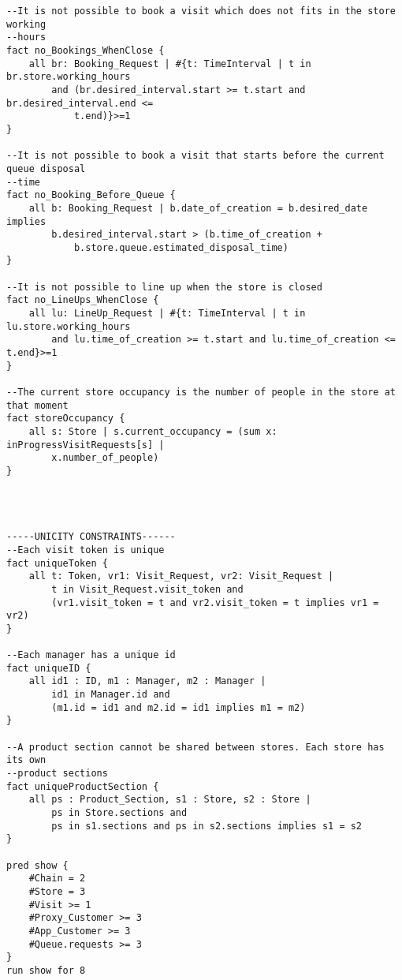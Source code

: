 \begin{lstlisting}[language=alloy]
--It is not possible to book a visit which does not fits in the store working 
--hours
fact no_Bookings_WhenClose {
    all br: Booking_Request | #{t: TimeInterval | t in br.store.working_hours 
        and (br.desired_interval.start >= t.start and br.desired_interval.end <= 
            t.end)}>=1
}

--It is not possible to book a visit that starts before the current queue disposal
--time
fact no_Booking_Before_Queue {
    all b: Booking_Request | b.date_of_creation = b.desired_date implies 
        b.desired_interval.start > (b.time_of_creation + 
            b.store.queue.estimated_disposal_time)
}

--It is not possible to line up when the store is closed
fact no_LineUps_WhenClose {
    all lu: LineUp_Request | #{t: TimeInterval | t in lu.store.working_hours 
        and lu.time_of_creation >= t.start and lu.time_of_creation <= t.end}>=1
}

--The current store occupancy is the number of people in the store at that moment
fact storeOccupancy {
    all s: Store | s.current_occupancy = (sum x: inProgressVisitRequests[s] | 
        x.number_of_people)
}




-----UNICITY CONSTRAINTS------
--Each visit token is unique
fact uniqueToken {
    all t: Token, vr1: Visit_Request, vr2: Visit_Request | 
        t in Visit_Request.visit_token and
        (vr1.visit_token = t and vr2.visit_token = t implies vr1 = vr2)
}

--Each manager has a unique id
fact uniqueID {
    all id1 : ID, m1 : Manager, m2 : Manager | 
        id1 in Manager.id and
        (m1.id = id1 and m2.id = id1 implies m1 = m2)
}

--A product section cannot be shared between stores. Each store has its own 
--product sections
fact uniqueProductSection {
    all ps : Product_Section, s1 : Store, s2 : Store | 
        ps in Store.sections and
        ps in s1.sections and ps in s2.sections implies s1 = s2
}

pred show {
    #Chain = 2 
    #Store = 3
    #Visit >= 1
    #Proxy_Customer >= 3 
    #App_Customer >= 3
    #Queue.requests >= 3
}
run show for 8
\end{lstlisting}
\endinput